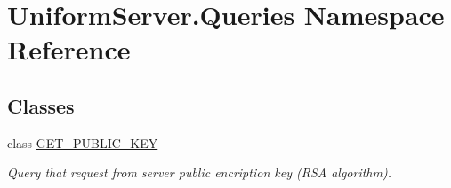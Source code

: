 \hypertarget{namespace_uniform_server_1_1_queries}{}\section{Uniform\+Server.\+Queries Namespace Reference}
\label{namespace_uniform_server_1_1_queries}
\subsection*{Classes}
\begin{DoxyCompactItemize}
\item 
class \mbox{\hyperlink{class_uniform_server_1_1_queries_1_1_g_e_t___p_u_b_l_i_c___k_e_y}{G\+E\+T\+\_\+\+P\+U\+B\+L\+I\+C\+\_\+\+K\+EY}}
\begin{DoxyCompactList}\small\item\em Query that request from server public encription key (R\+SA algorithm). \end{DoxyCompactList}\end{DoxyCompactItemize}
